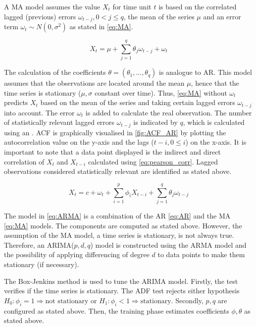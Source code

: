 A \ac{MA} model assumes the value $X_t$ for time unit $t$ is based on the correlated lagged (previous) errors $\omega_{t-j}, 0 < j \le q$, the mean of the series $\mu$ and an error term $\omega_t \sim  N(0, \sigma^2)$ as stated in \eqref{eq:MA}.
%
\begin{ceqn}
    \begin{equation}
    \label{eq:MA}
        X_t = \mu + \sum_{j=1}^q \theta_j \omega_{t-j} + \omega_t
    \end{equation}
\end{ceqn}
%
The calculation of the coefficients $\theta = (\theta_1, ..., \theta_q)$ is analogue to \ac{AR}.
This model assumes that the observations are located around the mean $\mu$, hence that the time series is stationary ($\mu, \sigma$ constant over time).
Thus, \eqref{eq:MA} without $\omega_t$ predicts $X_t$ based on the mean of the series and taking certain lagged errors $\omega_{t-j}$ into account. 
The error $\omega_t$ is added to calculate the real observation.
The number of statistically relevant lagged errors $\omega_{t-j}$ is indicated by $q$, which is calculated using an .
\ac{ACF} is graphically visualised in \autoref{fig:ACF_AR} by plotting the autocorrelation value on the y-axis and the lags ($t - i, 0 \le i$) on the x-axis. It is important to note that a data point displayed is the indirect and direct correlation of $X_t$ and $X_ {t-i}$ calculated using \autoref{eq:pearson_corr}. Lagged observations considered statistically relevant are identified as stated above.
%
\begin{ceqn}
    \begin{equation}
    \label{eq:ARMA}
        X_t = c + \omega_t + \sum_{i=1}^p \phi_i X_{t-i} + \sum_{j=1}^q \theta_j \omega_{t-j} 
    \end{equation}
\end{ceqn}
%
The  model in \eqref{eq:ARMA} is a combination of the \ac{AR} \eqref{eq:AR} and the \ac{MA} \eqref{eq:MA} models. The components are computed as stated above. However, the assumption of the \ac{MA} model, a time series is stationary, is not always true. Therefore, an \ac{ARIMA}($p, d, q$) model is constructed using the \ac{ARMA} model and the possibility of applying differencing of degree $d$ to data points to make them stationary (if necessary).

The Box-Jenkins method is used to tune the \ac{ARIMA} model. 
Firstly, the  test verifies if the time series is stationary.
The \ac{ADF} test rejects either hypothesis $H_0: \phi_i = 1 \Rightarrow \text{not stationary}$ or $H_1: \phi_i < 1 \Rightarrow \text{stationary}$.
Secondly, $p, q$ are configured as stated above.
Then, the training phase estimates coefficients $\phi, \theta$ as stated above.

